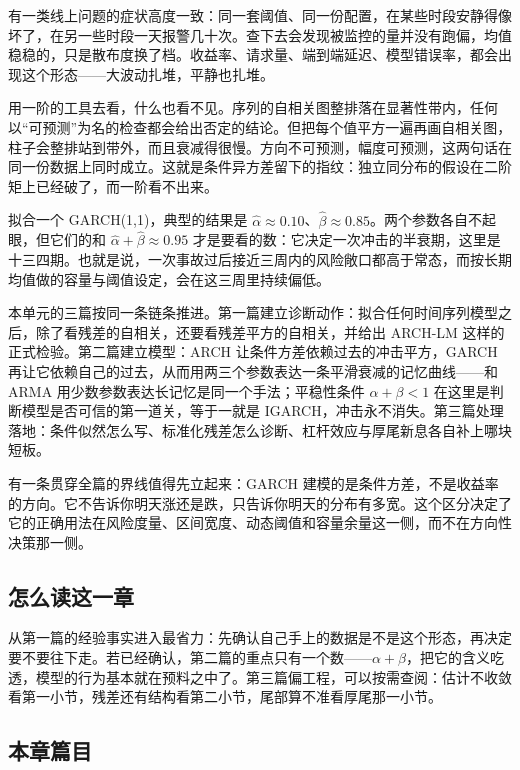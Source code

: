 有一类线上问题的症状高度一致：同一套阈值、同一份配置，在某些时段安静得像坏了，在另一些时段一天报警几十次。查下去会发现被监控的量并没有跑偏，均值稳稳的，只是散布度换了档。收益率、请求量、端到端延迟、模型错误率，都会出现这个形态——大波动扎堆，平静也扎堆。

用一阶的工具去看，什么也看不见。序列的自相关图整排落在显著性带内，任何以``可预测''为名的检查都会给出否定的结论。但把每个值平方一遍再画自相关图，柱子会整排站到带外，而且衰减得很慢。方向不可预测，幅度可预测，这两句话在同一份数据上同时成立。这就是条件异方差留下的指纹：独立同分布的假设在二阶矩上已经破了，而一阶看不出来。

拟合一个 GARCH(1,1)，典型的结果是 \(\hat\alpha\approx0.10\)、\(\hat\beta\approx0.85\)。两个参数各自不起眼，但它们的和 \(\hat\alpha+\hat\beta\approx0.95\) 才是要看的数：它决定一次冲击的半衰期，这里是十三四期。也就是说，一次事故过后接近三周内的风险敞口都高于常态，而按长期均值做的容量与阈值设定，会在这三周里持续偏低。

本单元的三篇按同一条链条推进。第一篇建立诊断动作：拟合任何时间序列模型之后，除了看残差的自相关，还要看残差平方的自相关，并给出 ARCH-LM 这样的正式检验。第二篇建立模型：ARCH 让条件方差依赖过去的冲击平方，GARCH 再让它依赖自己的过去，从而用两三个参数表达一条平滑衰减的记忆曲线——和 ARMA 用少数参数表达长记忆是同一个手法；平稳性条件 \(\alpha+\beta<1\) 在这里是判断模型是否可信的第一道关，等于一就是 IGARCH，冲击永不消失。第三篇处理落地：条件似然怎么写、标准化残差怎么诊断、杠杆效应与厚尾新息各自补上哪块短板。

有一条贯穿全篇的界线值得先立起来：GARCH 建模的是条件方差，不是收益率的方向。它不告诉你明天涨还是跌，只告诉你明天的分布有多宽。这个区分决定了它的正确用法在风险度量、区间宽度、动态阈值和容量余量这一侧，而不在方向性决策那一侧。

\subsection{怎么读这一章}

从第一篇的经验事实进入最省力：先确认自己手上的数据是不是这个形态，再决定要不要往下走。若已经确认，第二篇的重点只有一个数——\(\alpha+\beta\)，把它的含义吃透，模型的行为基本就在预料之中了。第三篇偏工程，可以按需查阅：估计不收敛看第一小节，残差还有结构看第二小节，尾部算不准看厚尾那一小节。

\subsection{本章篇目}

